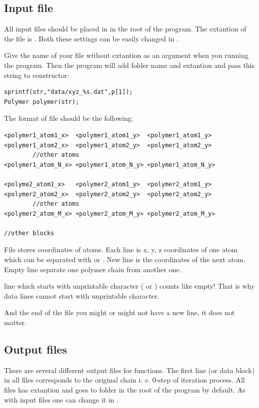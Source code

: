 \documentclass[12pt]{article}
\begin{document}
\begin{mySection}

\subsection{Input file}\label{sec:inputFile}
All input files should be placed in  in the root of the program. The extantion of the file is . Both these settings can be easily changed in .

Give the name of your file without extantion as an argument when you running the program. Then the program will add folder name and extantion and pass this string to  constructor:

\begin{lstlisting}
sprintf(str,"data/xyz_%s.dat",p[1]);
Polymer polymer(str);
\end{lstlisting}

The format of   file should be the following:

\begin{lstlisting}
<polymer1_atom1_x>	<polymer1_atom1_y>	<polymer1_atom1_y>
<polymer1_atom2_x>	<polymer1_atom2_y>	<polymer1_atom2_y>
		//other atoms	
<polymer1_atom_N_x>	<polymer1_atom_N_y>	<polymer1_atom_N_y>

<polyme2_atom1_x>	<polymer2_atom1_y>	<polymer2_atom1_y>
<polymer2_atom2_x>	<polymer2_atom2_y>	<polymer2_atom2_y>
		//other atoms	
<polymer2_atom_M_x>	<polymer2_atom_M_y>	<polymer2_atom_M_y>

//other blocks
\end{lstlisting}

File stores coordinates of atoms. Each line is x, y, z coordinates of one atom which can be separated with  or . New line is the coordinates of the next atom. Empty line separate one polymer chain from another one.

\important line which starts with unprintable character ( or ) counts like empty! That is why data lines cannot start with unprintable character.

And the end of the file you might or might not have a new line, it does not matter.

\subsection{Output files}\label{ssec:outputFiles}
There are several different output files for  functions. The first line (or data block) in all files corresponds to the original chain i. e. 0-step of iteration process.
All files has  extantion and goes to  folder in the root of the program by default. As with input files one can change it in .


\end{mySection}
\end{document}
